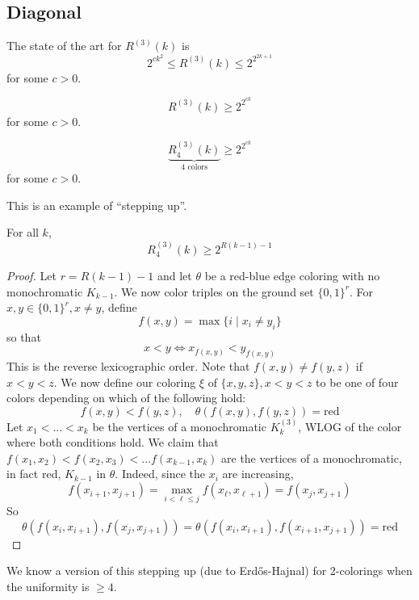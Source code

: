 \documentclass{article}
\begin{document}
\subsection{Diagonal}

\newlec

The state of the art for $R^{(3)}(k)$ is
$$2^{ck^2} \le R^{(3)}(k) \le 2^{2^{2k + 1}}$$
for some $c > 0$.

\begin{conj}
  $$R^{(3)}(k) \ge 2^{2^{ck}}$$
  for some $c > 0$.
\end{conj}

\begin{thm}
  $$\underbrace{R_4^{(3)}(k)}_{4\text{ colors}} \ge 2^{2^{ck}}$$
  for some $c > 0$.
\end{thm}

This is an example of ``stepping up''.

\begin{lem}
  For all $k$,
  $$R_4^{(3)}(k) \ge 2^{R(k - 1) - 1}$$
\end{lem}
\begin{proof}
  Let $r = R(k - 1) - 1$ and let $\theta$ be a red-blue edge coloring with no monochromatic $K_{k - 1}$. We now color triples on the ground set $\{0, 1\}^r$. For $x, y \in \{0, 1\}^r, x \ne y$, define
  $$f(x, y) = \max \{i \mid x_i \ne y_i\}$$
  so that
  $$x < y \iff x_{f(x, y)} < y_{f(x, y)}$$
  This is the reverse lexicographic order. Note that $f(x, y) \ne f(y, z)$ if $x < y < z$. We now define our coloring $\xi$ of $\{x, y, z\}, x < y < z$ to be one of four colors depending on which of the following hold:
  $$f(x, y) < f(y, z), \quad \theta(f(x, y), f(y, z)) = \text{red}$$
  Let $x_1 < \dots < x_k$ be the vertices of a monochromatic $K_k^{(3)}$, WLOG of the color where both conditions hold. We claim that $f(x_1, x_2) < f(x_2, x_3) < \dots f(x_{k - 1}, x_k)$ are the vertices of a monochromatic, in fact red, $K_{k - 1}$ in $\theta$. Indeed, since the $x_i$ are increasing,
  $$f(x_{i + 1}, x_{j + 1}) = \max_{i < \ell \le j} f(x_\ell, x_{\ell + 1}) = f(x_j, x_{j + 1})$$
  So
  $$\theta(f(x_i, x_{i + 1}), f(x_j, x_{j + 1})) = \theta(f(x_i, x_{i + 1}), f(x_{i + 1}, x_{j + 1})) = \text{red}$$
\end{proof}

\begin{rmk}
  We know a version of this stepping up (due to Erd\H os-Hajnal) for 2-colorings when the uniformity is $\ge 4$.
\end{rmk}
\end{document}
